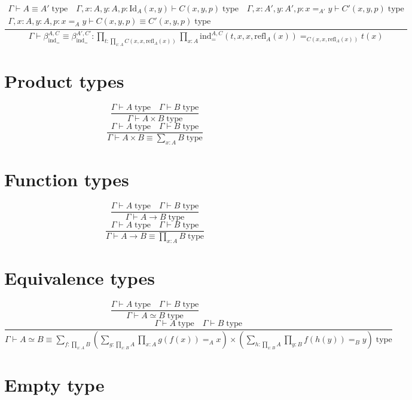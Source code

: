 \documentclass{book}
\begin{document}
$$\frac{
\begin{array}{c}
	\Gamma \vdash A \equiv A' \; \mathrm{type} \quad \Gamma, x:A, y:A, p:\mathrm{Id}_A(x, y) \vdash C(x, y, p) \; \mathrm{type} \quad \Gamma, x:A', y:A', p:x =_{A'} y \vdash C'(x, y, p) \; \mathrm{type} \\
	\Gamma, x:A, y:A, p:x =_A y \vdash C(x, y, p) \equiv C'(x, y, p) \; \mathrm{type}
\end{array}
}{\Gamma \vdash \beta_{ \mathrm{ind}_=}^{A, C} \equiv \beta_{\mathrm{ind}_=}^{A', C'}:\prod_{t:\prod_{x:A} C(x, x, \mathrm{refl}_A(x))} \prod_{x:A} \mathrm{ind}_{=}^{A, C}(t, x, x, \mathrm{refl}_A(x)) =_{C(x, x, \mathrm{refl}_A(x))} t(x)}$$

\section{Product types}
$$\frac{\Gamma \vdash A \; \mathrm{type} \quad \Gamma \vdash B \; \mathrm{type}}{\Gamma \vdash A \times B \; \mathrm{type}}$$
$$\frac{\Gamma \vdash A \; \mathrm{type} \quad \Gamma \vdash B \; \mathrm{type}}{\Gamma \vdash A \times B \equiv \sum_{x:A} B \; \mathrm{type}}$$

\section{Function types}
$$\frac{\Gamma \vdash A \; \mathrm{type} \quad \Gamma \vdash B \; \mathrm{type}}{\Gamma \vdash A \to B \; \mathrm{type}}$$
$$\frac{\Gamma \vdash A \; \mathrm{type} \quad \Gamma \vdash B \; \mathrm{type}}{\Gamma \vdash A \to B \equiv \prod_{x:A} B \; \mathrm{type}}$$

\section{Equivalence types}

$$\frac{\Gamma \vdash A \; \mathrm{type} \quad \Gamma \vdash B \; \mathrm{type}}{\Gamma \vdash A \simeq B \; \mathrm{type}}$$ 
$$\frac{\Gamma \vdash A \; \mathrm{type} \quad \Gamma \vdash B \; \mathrm{type}}{\Gamma \vdash A \simeq B \equiv \sum_{f:\prod_{x:A} B} \left(\sum_{g:\prod_{x:B} A} \prod_{x:A} g(f(x)) =_A x\right) \times \left(\sum_{h:\prod_{x:B} A} \prod_{y:B} f(h(y)) =_B y\right) \; \mathrm{type}}$$

\section{Empty type}
\end{document}

